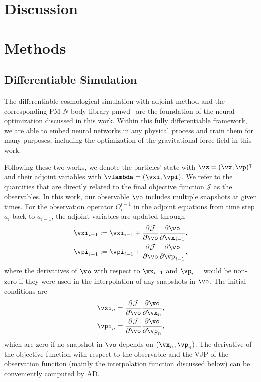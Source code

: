 \documentclass[modern, trackchanges, dvipsnames]{aastex631}
\newcommand{\pmwd}{{\usefont{T1}{nova}{m}{sl}pmwd}}
\newcommand{\p}{\partial}
\newcommand{\cJ}{\mathcal{J}}
\begin{document}
\vspace{1em}
\section{Discussion}


\vspace{1em}
\section{Methods}


\vspace{1em}
\subsection{Differentiable Simulation}

The differentiable cosmological simulation with adjoint method \citep{Li2022a}
and the corresponding PM $N$-body library \pmwd\ \citep{Li2022b} are the
foundation of the neural optimization discussed in this work.
Within this fully differentiable framework, we are able to embed neural networks
in any physical process and train them for many purposes, including the
optimization of the gravitational force field in this work.

Following these two works, we denote the particles' state with $\vz = (\vx,
\vp)^\intercal$ and their adjoint variables with $\vlambda = (\vxi, \vpi)$.
We refer to the quantities that are directly related to the final objective
function $\cJ$ as the observables.
In this work, our observable $\vo$ includes multiple snapshots at given times.
For the observation operator $O_{i}^{i-1}$ in the adjoint equations from time
step $a_i$ back to $a_{i-1}$, the adjoint variables are updated through
\begin{align}
  \vxi_{i-1} &:= \vxi_{i-1} + \frac{\p\cJ}{\p\vo}\frac{\p\vo}{\p \vx_{i-1}}, \nonumber\\
  \vpi_{i-1} &:= \vpi_{i-1} + \frac{\p\cJ}{\p\vo}\frac{\p\vo}{\p \vp_{i-1}},
\end{align}
where the derivatives of $\vo$ with respect to $\vx_{i-1}$ and $\vp_{i-1}$ would
be non-zero if they were used in the interpolation of any snapshots in $\vo$.
The initial conditions are
\begin{align}
  \vxi_n &= \frac{\p\cJ}{\p\vo}\frac{\p\vo}{\p\vx_n}, \nonumber\\
  \vpi_n &= \frac{\p\cJ}{\p\vo}\frac{\p\vo}{\p\vp_n},
\end{align}
which are zero if no snapshot in $\vo$ depends on $(\vx_n, \vp_n)$.
The derivative of the objective function with respect to the observable and the
VJP of the observation funciton (mainly the interpolation function discussed
below) can be conveniently computed by AD.
\end{document}

